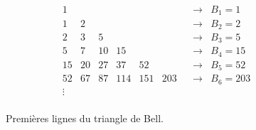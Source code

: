 \begin{figure}[h]
\begin{center}
 \[ 
    \begin{matrix}
    1 & & & & & & & \longrightarrow & B_1= 1\\
    1 & 2 & & & & & & \longrightarrow & B_2= 2\\
    2 & 3 & 5 & & & & & \longrightarrow & B_3= 5\\
    5 & 7 & 10 & 15 & & &&  \longrightarrow & B_4= 15\\
    15 & 20 & 27 & 37 & 52 & & & \longrightarrow & B_5= 52\\
    52 & 67 & 87 & 114 & 151 & 203 & & \longrightarrow & B_6= 203\\    
    \vdots\\
    \end{matrix}
\]
\caption{\label{bell} Premières lignes du triangle de Bell.}
\end{center}
\end{figure}

